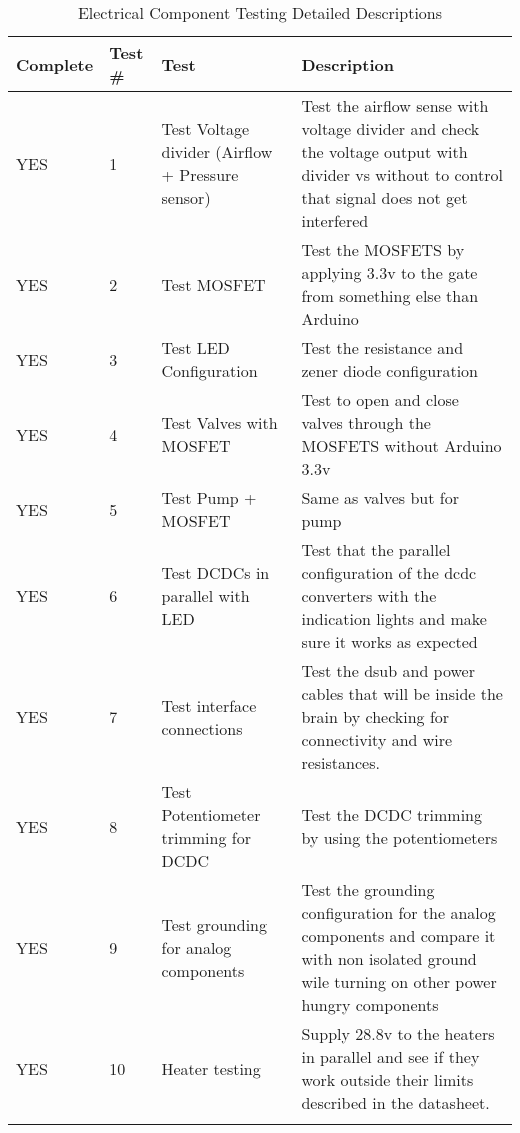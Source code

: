 
\begin{longtable}{|m{}|m{}|m{}|m{}|}
\hline
Complete & Test \# & Test & Description \\ \hline
YES & 1 & Test Voltage divider (Airflow + Pressure sensor) & Test the airflow sense with voltage divider and check the voltage output with divider vs without to control that signal does not get interfered \\ \hline
YES & 2 & Test MOSFET & Test the MOSFETS by applying 3.3v to the gate from something else than Arduino \\ \hline
YES & 3 & Test LED Configuration & Test the resistance and zener diode configuration\\ \hline
YES & 4 & Test Valves with MOSFET & Test to open and close valves through the MOSFETS without Arduino 3.3v  \\ \hline
YES & 5 & Test Pump + MOSFET & Same as valves but for pump  \\ \hline
YES & 6 & Test DCDCs in parallel with LED & Test that the parallel configuration of the dcdc converters with the indication lights and make sure it works as expected  \\ \hline
YES & 7 & Test interface connections & Test the dsub and power cables that will be inside the brain by checking for connectivity and wire resistances.  \\ \hline
YES & 8 & Test Potentiometer trimming for DCDC & Test the DCDC trimming by using the potentiometers \\ \hline
YES & 9 & Test grounding for analog components & Test the grounding configuration for the analog components and compare it with non isolated ground wile turning on other power hungry components \\ \hline
YES & 10 & Heater testing & Supply 28.8v to the heaters in parallel and see if they work outside their limits described in the datasheet. \\ \hline
\caption{Electrical Component Testing Detailed Descriptions}
\label{tab:test33-result-electrical-component}
\end{longtable}